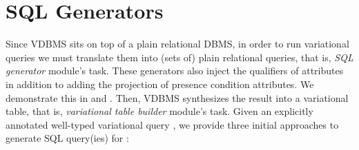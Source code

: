 \section{SQL Generators}
\label{sec:apps}


%
Since VDBMS sits on top of a plain relational DBMS, in order to run
variational queries we must translate them into (sets of) plain relational queries,
that is, \emph{SQL generator} module's task.
These generators also inject the qualifiers of attributes in addition to 
adding the projection of presence condition attributes. We demonstrate this
in  and .
Then, VDBMS synthesizes the result into a variational table, that is, 
\emph{variational table builder} module's task.
%
Given an explicitly annotated well-typed variational query \vQ,
we provide three initial 
approaches to generate SQL query(ies) for \vQ:
